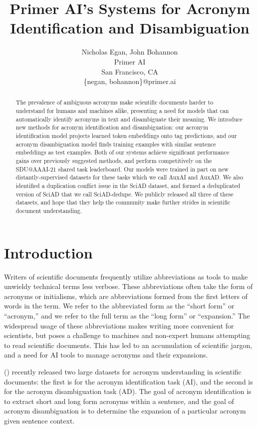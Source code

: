 \documentclass[letterpaper]{article} %
\title{Primer AI's Systems for Acronym Identification and Disambiguation}
\author{Nicholas Egan, John Bohannon\\ %
Primer AI\\ %
San Francisco, CA\\
\{negan, bohannon\}@primer.ai %
}
\begin{document}
\maketitle

\begin{abstract}
The prevalence of ambiguous acronyms make scientific documents harder to understand for humans and machines alike, presenting a need for models that can automatically identify acronyms in text and disambiguate their meaning. We introduce new methods for acronym identification and disambiguation: our acronym identification model projects learned token embeddings onto tag predictions, and our acronym disambiguation model finds training examples with similar sentence embeddings as test examples. Both of our systems achieve significant performance gains over previously suggested methods, and perform competitively on the SDU@AAAI-21 shared task leaderboard. Our models were trained in part on new distantly-supervised datasets for these tasks which we call AuxAI and AuxAD. We also identified a duplication conflict issue in the SciAD dataset, and formed a deduplicated version of SciAD that we call SciAD-dedupe. We publicly released all three of these datasets, and hope that they help the community make further strides in scientific document understanding.
\end{abstract}

\section{Introduction}
Writers of scientific documents frequently utilize abbreviations as tools to make unwieldy technical terms less verbose. These abbreviations often take the form of acronyms or initialisms, which are abbreviations formed from the first letters of words in the term. We refer to the abbreviated form as the ``short form'' or ``acronym,'' and we refer to the full term as the ``long form'' or ``expansion.'' The widespread usage of these abbreviations makes writing more convenient for scientists, but poses a challenge to machines and non-expert humans attempting to read scientific documents. This has led to an accumulation of scientific jargon, and a need for AI tools to manage acronyms and their expansions.

\citeauthor{veyseh-et-al-2020-what} (\citeyear{veyseh-et-al-2020-what}) recently released two large datasets for acronym understanding in scientific documents: the first is for the acronym identification task (AI), and the second is for the acronym disambiguation task (AD). The goal of acronym identification is to extract short and long form acronyms within a sentence, and the goal of acronym disambiguation is to determine the expansion of a particular acronym given sentence context.
\end{document}
